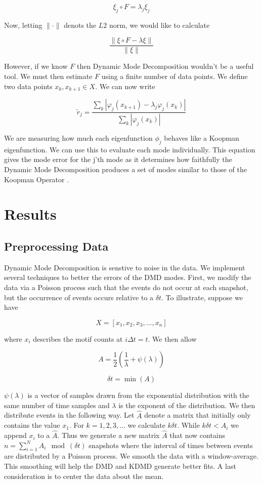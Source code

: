 $$
\xi_j \circ F = \lambda_j \xi_j
$$

\noindent Now, letting $\|\cdot\|$ denots the $L2$ norm, we would like to calculate 

$$
\frac{\| \xi \circ F - \lambda \xi \|}{\| \xi \|}
$$

\noindent However, if we know $F$ then Dynamic Mode Decomposition wouldn't be a useful tool.
We must then estimate $F$ using a finite number of data points. We define
two data points $x_k, x_{k+1} \in X$. We can now write 

$$
{\tilde r}_{j} = \frac{\sum_{k} |\varphi_j(x_{k+1}) - \lambda_j \varphi_j(x_{k})|}{\sum_{k} |\varphi_j(x_k )|}
$$

We are measuring how much each eigenfunction $\phi_j$ behaves like a Koopman eigenfunction. We can use 
this to evaluate each mode individually. This equation gives the mode error for the j'th mode as it determines how faithfully the Dynamic Mode Decomposition
produces a set of modes similar to those of the Koopman Operator \cite{zhang2017evaluating}. 

\chapter{Results}

\section{Preprocessing Data}
Dynamic Mode Decomposition is senstive to
 noise in the data. We implement several techniques to better the errors of the DMD modes.
  First, we modify the data via a Poisson process such that the events do not occur at each
snapshot, but the occurrence of events occurs relative to a $\delta t$. To illustrate, suppose we have 

$$
X = [x_1,x_2,x_3,\dots, x_n]
$$

\noindent where $x_i$ describes the motif counts at $i \Delta t = t$. We then allow

$$
A = \frac{1}{2} \left( \frac{1}{\lambda} +  \psi(\lambda) \right)
$$

$$
\delta t = \min(A)
$$

 $\psi(\lambda)$ is a vector of samples drawn from the exponential distribution with the same number of
 time samples and $\lambda$ is the exponent of the distribution. We then distribute events in the following
way. Let ${\hat A}$ denote a matrix that initially only contains the value $x_1$. For $k=1,2,3,\dots$ we calculate $k \delta t$. While $k\delta t < A_i$ we append $x_i$ to 
a ${\hat A}$. Thus we generate a new matrix ${\hat A}$ that now contains $n = \sum^{N}_{i=1} A_i \mod(\delta t)$ 
snapshots where the interval of times between events are distributed by a Poisson process. We
 smooth the data with a window-average. This smoothing will help the DMD and KDMD generate better fits. 
 A last consideration is to center the data about the mean.


